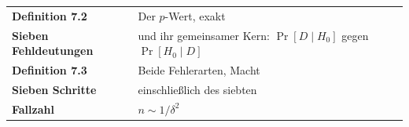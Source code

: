 \begin{merksatz}
\begin{center}
\renewcommand{\arraystretch}{1.5}
\begin{tabular}{@{}P{3.2cm}P{5.4cm}@{}}
\toprule
\textbf{Definition 7.2} & Der $p$-Wert, exakt\\
\textbf{Sieben Fehldeutungen} & und ihr gemeinsamer Kern: $\Pr[D\mid H_0]$ gegen $\Pr[H_0\mid D]$\\
\textbf{Definition 7.3} & Beide Fehlerarten, Macht\\
\textbf{Sieben Schritte} & einschließlich des siebten\\
\textbf{Fallzahl} & $n \sim 1/\delta^2$\\
\bottomrule
\end{tabular}
\end{center}

\begin{center}
\begin{minipage}{0.88\textwidth}
\end{minipage}
\end{center}
\end{merksatz}

